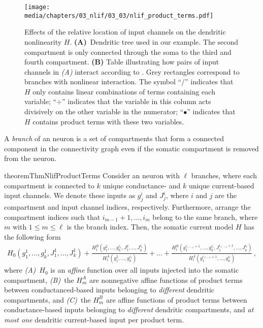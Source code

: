 \begin{figure}
	\centering
	\texttt{[image: media/chapters/03\_nlif/03\_03/nlif\_product\_terms.pdf]}
	\caption[Effects of the relative location of input channels on the dendritic nonlinearity $H$]{Effects of the relative location of input channels on the dendritic nonlinearity $H$. \textbf{(A)}~Dendritic tree used in our example.
	The second compartment is only connected through the soma to the third and fourth compartment.
	\textbf{(B)} Table illustrating how pairs of input channels in \emph{(A)} interact according to .
	Grey rectangles correspond to branches with nonlinear interaction.
	The symbol \enquote{$/$} indicates that $H$ only contains linear combinations of terms containing each variable; \enquote{$\div$} indicates that the variable in this column acts divisively on the other variable in the numerator; \enquote{$\bullet$} indicates that $H$ contains product terms with these two variables.}
	\label{fig:nlif_product_terms}
\end{figure}

\begin{definition}[Branch]
A \emph{branch} of an \nlif neuron is a set of compartments that form a connected component in the \nlif connectivity graph even if the somatic compartment is removed from the neuron.
\end{definition}

\begin{restatable}{theorem}{ThmNlifProductTerms}
\label{thm:nlif_product_terms}
Consider an \nlif neuron with $\ell$ branches, where each compartment is connected to $k$ unique con\-duc\-tance- and $k$ unique current-based input channels.
We denote these inputs as $g_j^i$ and $J_j^i$, where $i$ and $j$ are the compartment and input channel indices, respectively.
Furthermore, arrange the compartment indices such that $i_{m - 1} + 1, \ldots, i_{m}$ belong to the same branch, where $m$ with $1 \leq m \leq \ell$ is the branch index.
Then, the somatic current model $H$ has the following form
\begin{align*}
	H_0(g_1^1, \ldots, g_k^1, J_1^1, \ldots, J_k^1) +
	\frac{H^B_1(
		g_1^{2}, \ldots, g_k^{i_1} \!,
		J_1^{2}, \ldots, J_k^{i_1})
	}{
		H^A_1(g_1^{2}, \ldots, g_k^{i_1})
	}
	+ \ldots +
	\frac{H^B_\ell(
		g_1^{i_{\ell - 1} + 1}, \ldots, g_k^{i_\ell},
		J_1^{i_{\ell - 1} + 1}, \ldots, J_k^{i_\ell})
	}{
		H^A_\ell(g_1^{i_{\ell - 1} + 1}, \ldots, g_k^{i_\ell})
	} \,,
\end{align*}
where \emph{(A)}~$H_0$ is an \emph{affine} function over all inputs injected into the somatic compartment, \emph{(B)}~the $H^A_m$ are nonnegative affine functions of product terms between conductanced-based inputs belonging to \emph{different} dendritic compartments, and \emph{(C)}~the $H^B_m$ are affine functions of product terms between conductance-based inputs belonging to \emph{different} dendritic compartments, and \emph{at most one} dendritic current-based input per product term.
\end{restatable}

